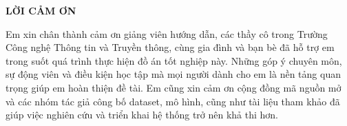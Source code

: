 \documentclass[../DoAn.tex]{subfiles}
\begin{document}
\begin{center}
    \Large{\textbf{LỜI CẢM ƠN}}\\
\end{center}
\vspace{1cm}
Em xin chân thành cảm ơn giảng viên hướng dẫn, các thầy cô trong Trường Công nghệ Thông tin và Truyền thông, cùng gia đình và bạn bè đã hỗ trợ em trong suốt quá trình thực hiện đồ án tốt nghiệp này. Những góp ý chuyên môn, sự động viên và điều kiện học tập mà mọi người dành cho em là nền tảng quan trọng giúp em hoàn thiện đề tài. Em cũng xin cảm ơn cộng đồng mã nguồn mở và các nhóm tác giả công bố dataset, mô hình, cũng như tài liệu tham khảo đã giúp việc nghiên cứu và triển khai hệ thống trở nên khả thi hơn.
\end{document}
